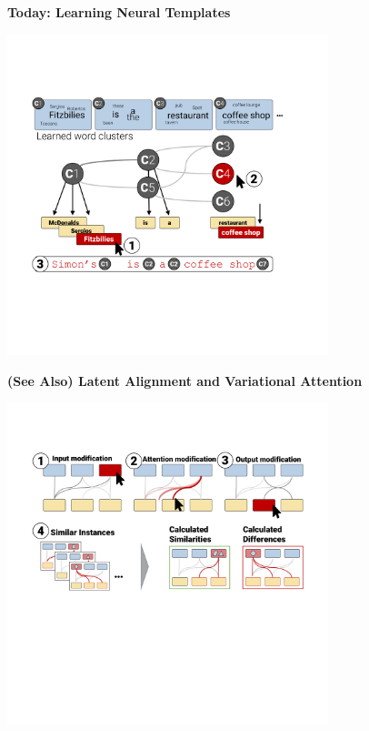 \documentclass[aspectratio=169,12pt]{beamer}
\begin{document}
\begin{frame}
  \begin{center}
    \textbf{Today: Learning Neural Templates}
  \end{center}

  \begin{center}
    \includegraphics[width=0.7\textwidth]{DecoderVis}
  \end{center}
\end{frame}

\begin{frame}
  \begin{center}
    \textbf{(See Also) Latent Alignment and Variational Attention}


  \end{center}

  \begin{center}
    \includegraphics[width=0.7\textwidth]{AttentionVIS}
  \end{center}
\end{frame}
\end{document}
